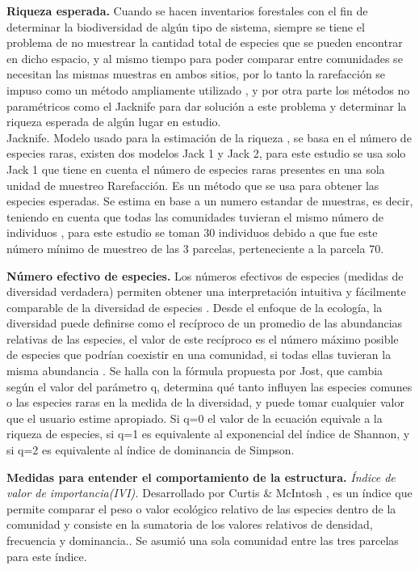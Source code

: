 \documentclass[conference,final,12pt,]{IEEEtran}
\begin{document}
\textbf{Riqueza esperada.} Cuando se hacen inventarios forestales con el
fin de determinar la biodiversidad de algún tipo de sistema, siempre se
tiene el problema de no muestrear la cantidad total de especies que se
pueden encontrar en dicho espacio, y al mismo tiempo para poder comparar
entre comunidades se necesitan las mismas muestras en ambos sitios, por
lo tanto la rarefacción se impuso como un método ampliamente utilizado
\citep{Z}, y por otra parte los métodos no paramétricos como el Jacknife
\citep{AA} para dar solución a este problema y determinar la riqueza
esperada de algún lugar en estudio.\\
Jacknife. Modelo usado para la estimación de la riqueza \citep{X}, se
basa en el número de especies raras, existen dos modelos Jack 1 y Jack
2, para este estudio se usa solo Jack 1 que tiene en cuenta el número de
especies raras presentes en una sola unidad de muestreo \citep{Y}
Rarefacción. Es un método que se usa para obtener las especies
esperadas. Se estima en base a un numero estandar de muestras, es decir,
teniendo en cuenta que todas las comunidades tuvieran el mismo número de
individuos \citep{B}, para este estudio se toman 30 individuos debido a
que fue este número mínimo de muestreo de las 3 parcelas, perteneciente
a la parcela 70.

\textbf{Número efectivo de especies.} Los números efectivos de especies
(medidas de diversidad verdadera) permiten obtener una interpretación
intuitiva y fácilmente comparable de la diversidad de especies \citep{V}.
Desde el enfoque de la ecología, la diversidad puede definirse como el
recíproco de un promedio de las abundancias relativas de las especies,
el valor de este recíproco es el número máximo posible de especies que
podrían coexistir en una comunidad, si todas ellas tuvieran la misma
abundancia \citep{W}. Se halla con la fórmula propuesta por Jost, que
cambia según el valor del parámetro q, determina qué tanto influyen las
especies comunes o las especies raras en la medida de la diversidad, y
puede tomar cualquier valor que el usuario estime apropiado. Si q=0 el
valor de la ecuación equivale a la riqueza de especies, si q=1 es
equivalente al exponencial del índice de Shannon, y si q=2 es
equivalente al índice de dominancia de Simpson.

\textbf{Medidas para entender el comportamiento de la estructura.}
\emph{Índice de valor de importancia(IVI).} Desarrollado por Curtis \& McIntosh
\citep{T}, es un índice que permite comparar el peso o valor ecológico
relativo de las especies dentro de la comunidad y consiste en la
sumatoria de los valores relativos de densidad, frecuencia y
dominancia.\citep{U}. Se asumió una sola comunidad entre las tres
parcelas para este índice.
\end{document}
